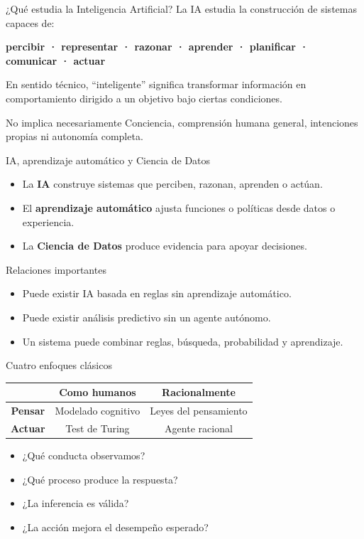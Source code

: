 \documentclass[aspectratio=169,11pt]{beamer}
\newcommand{\concepto}[1]{\textcolor{UAPTeal}{\textbf{#1}}}
\begin{document}
\begin{frame}{¿Qué estudia la Inteligencia Artificial?}
  La IA estudia la construcción de sistemas capaces de:
  \begin{center}
    \concepto{percibir · representar · razonar · aprender · planificar · comunicar · actuar}
  \end{center}
  En sentido técnico, ``inteligente'' significa transformar información en comportamiento dirigido a un objetivo bajo ciertas condiciones.
  \vspace{0.5em}
  \begin{block}{No implica necesariamente}
    Conciencia, comprensión humana general, intenciones propias ni autonomía completa.
  \end{block}
\end{frame}

\begin{frame}{IA, aprendizaje automático y Ciencia de Datos}
  \begin{itemize}
    \item La \concepto{IA} construye sistemas que perciben, razonan, aprenden o actúan.
    \item El \concepto{aprendizaje automático} ajusta funciones o políticas desde datos o experiencia.
    \item La \concepto{Ciencia de Datos} produce evidencia para apoyar decisiones.
  \end{itemize}
  \vspace{0.5em}
  \begin{block}{Relaciones importantes}
    \begin{itemize}
      \item Puede existir IA basada en reglas sin aprendizaje automático.
      \item Puede existir análisis predictivo sin un agente autónomo.
      \item Un sistema puede combinar reglas, búsqueda, probabilidad y aprendizaje.
    \end{itemize}
  \end{block}
\end{frame}

\begin{frame}{Cuatro enfoques clásicos}
  \centering
  \renewcommand{\arraystretch}{1.5}
  \begin{tabular}{>{\bfseries}c|c|c}
    & Como humanos & Racionalmente \\
    \hline
    Pensar & Modelado cognitivo & Leyes del pensamiento \\
    Actuar & Test de Turing & Agente racional \\
  \end{tabular}
  \vfill
  \begin{itemize}
    \item ¿Qué conducta observamos?
    \item ¿Qué proceso produce la respuesta?
    \item ¿La inferencia es válida?
    \item ¿La acción mejora el desempeño esperado?
  \end{itemize}
\end{frame}
\end{document}
